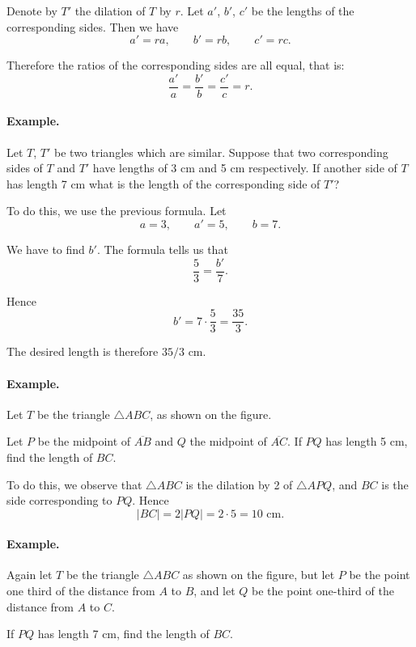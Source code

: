 \documentclass[12pt]{book} %
\begin{document}

Denote by $T'$ the dilation of $T$ by $r$. Let $a'$, $b'$, $c'$ be the lengths of the corresponding sides. Then we have
\[
a'=ra,\qquad b'=rb,\qquad c'=rc.
\]

Therefore the ratios of the corresponding sides are all equal, that is:
\[
\frac{a'}{a}=\frac{b'}{b}=\frac{c'}{c}=r.
\]

\paragraph{Example.}
Let $T$, $T'$ be two triangles which are similar. Suppose that two corresponding sides of $T$ and $T'$ have lengths of 3 cm and 5 cm respectively. If another side of $T$ has length 7 cm what is the length of the corresponding side of $T'$?

To do this, we use the previous formula. Let
\[
a=3,\qquad a'=5,\qquad b=7.
\]

We have to find $b'$. The formula tells us that
\[
\frac{5}{3}=\frac{b'}{7}.
\]

Hence
\[
b'=7\cdot \frac{5}{3}=\frac{35}{3}.
\]

The desired length is therefore $35/3$ cm.

\paragraph{Example.}
Let $T$ be the triangle $\triangle ABC$, as shown on the figure.


Let $P$ be the midpoint of $\overline{AB}$ and $Q$ the midpoint of $\overline{AC}$. If $PQ$ has length 5 cm, find the length of $BC$.

To do this, we observe that $\triangle ABC$ is the dilation by 2 of $\triangle APQ$, and $BC$ is the side corresponding to $PQ$. Hence
\[
|BC|=2|PQ|=2\cdot 5=10\text{ cm.}
\]

\paragraph{Example.}
Again let $T$ be the triangle $\triangle ABC$ as shown on the figure, but let $P$ be the point one third of the distance from $A$ to $B$, and let $Q$ be the point one-third of the distance from $A$ to $C$.


If $PQ$ has length 7 cm, find the length of $BC$.
\end{document}
